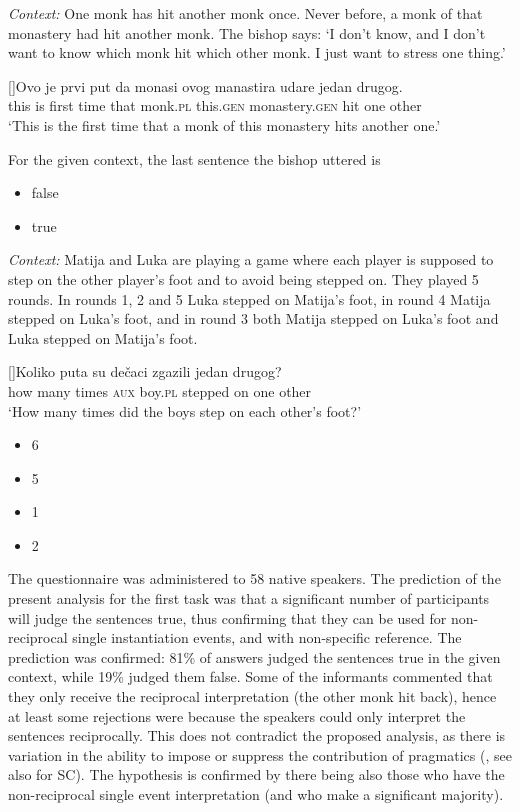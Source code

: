 \documentclass[output=paper,colorlinks,citecolor=brown]{langscibook}
\begin{document}
\eanoraggedright
\textit{Context:} One monk has hit another monk once. Never before, a monk of that monastery had hit another monk. The bishop says: `I don't know, and I don't want to know which monk hit which other monk. I just want to stress one thing.'\medskip
\begin{xlist}
\exi{}[]{\gll Ovo je prvi put da monasi ovog manastira udare jedan drugog.\\
 this is first time that monk.\textsc{pl} this.\textsc{gen} monastery.\textsc{gen} hit one other\\
\glt `This is the first time that a monk of this monastery hits another one.'\medskip}
\end{xlist}
For the given context, the last sentence the bishop uttered is

\begin{itemize}
\item false
\item true
\end{itemize}\label{ex:Context1}
 \z 

\eanoraggedright\label{ex:Context2} \textit{Context:} Matija and Luka are playing a game where each player is supposed to step on the other player's foot and to avoid being stepped on. They played 5 rounds. In rounds 1, 2 and 5 Luka stepped on Matija's foot, in round 4 Matija stepped on Luka's foot, and in round 3 both Matija stepped on Luka's foot and Luka stepped on Matija's foot.\medskip

\begin{xlist}
\exi{}[]{\gll Koliko puta su dečaci zgazili jedan drugog?\\
 {how many} times \textsc{aux} boy.\textsc{pl} {stepped on} one other\\
\glt `How many times did the boys step on each other's foot?'}
\begin{itemize}
\item 6
\item 5
\item 1
\item 2
\end{itemize}
\end{xlist}
 \z

\noindent The questionnaire was administered to 58 native speakers. The prediction of the present analysis for the first task was that a significant number of participants will judge the sentences true, thus confirming that they can be used for non-reciprocal single instantiation events, and with non-specific reference. The prediction was confirmed: 81\% of answers judged the sentences true in the given context, while 19\% judged them false. Some of the informants commented that they only receive the reciprocal interpretation (the other monk hit back), hence at least some rejections were because the speakers could only interpret the sentences reciprocally. This does not contradict the proposed analysis, as there is variation in the ability to impose or suppress the contribution of pragmatics (\citealt{i18}, see also \citealt{ma13} for SC). The hypothesis is confirmed by there being also those who have the non-reciprocal single event interpretation (and who make a significant majority).
\end{document}
